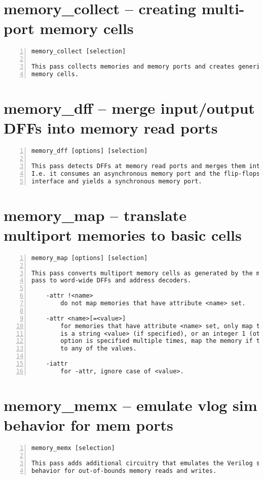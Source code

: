 \section{memory\_collect -- creating multi-port memory cells}
\label{cmd:memory_collect}
\begin{lstlisting}[numbers=left,frame=single]
    memory_collect [selection]

This pass collects memories and memory ports and creates generic multiport
memory cells.
\end{lstlisting}

\section{memory\_dff -- merge input/output DFFs into memory read ports}
\label{cmd:memory_dff}
\begin{lstlisting}[numbers=left,frame=single]
    memory_dff [options] [selection]

This pass detects DFFs at memory read ports and merges them into the memory port.
I.e. it consumes an asynchronous memory port and the flip-flops at its
interface and yields a synchronous memory port.
\end{lstlisting}

\section{memory\_map -- translate multiport memories to basic cells}
\label{cmd:memory_map}
\begin{lstlisting}[numbers=left,frame=single]
    memory_map [options] [selection]

This pass converts multiport memory cells as generated by the memory_collect
pass to word-wide DFFs and address decoders.

    -attr !<name>
        do not map memories that have attribute <name> set.

    -attr <name>[=<value>]
        for memories that have attribute <name> set, only map them if its value
        is a string <value> (if specified), or an integer 1 (otherwise). if this
        option is specified multiple times, map the memory if the attribute is
        to any of the values.

    -iattr
        for -attr, ignore case of <value>.
\end{lstlisting}

\section{memory\_memx -- emulate vlog sim behavior for mem ports}
\label{cmd:memory_memx}
\begin{lstlisting}[numbers=left,frame=single]
    memory_memx [selection]

This pass adds additional circuitry that emulates the Verilog simulation
behavior for out-of-bounds memory reads and writes.
\end{lstlisting}


